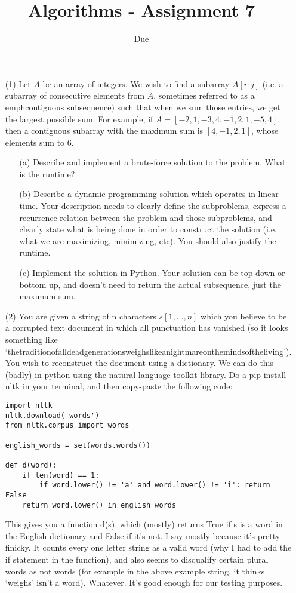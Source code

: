 \documentclass[12pt]{article}
\title{Algorithms - Assignment 7}
\date{Due }
\begin{document}
\maketitle

\begin{enumerate}
    \item[(1)] Let $A$ be an array of integers. We wish to find a subarray $A[i:j]$ (i.e. a subarray of consecutive elements from $A$, sometimes referred to as a 
    emph{contiguous subsequence}) such that when we sum those entries, we get the largest possible sum. For example, if $A=[-2, 1, -3, 4, -1, 2, 1, -5, 4]$, then a contiguous subarray with the maximum sum is $[4,-1,2,1]$, whose elements sum to $6$.
    \begin{itemize}
        \item[(a)] Describe and implement a brute-force solution to the problem. What is the runtime? 
        \item[(b)] Describe a dynamic programming solution which operates in linear time. Your description needs to clearly define the subproblems, express a recurrence relation between the problem and those subproblems, and clearly state what is being done in order to construct the solution (i.e. what we are maximizing, minimizing, etc). You should also justify the runtime. 
        \item[(c)] Implement the solution in Python. Your solution can be top down or bottom up, and doesn't need to return the actual subsequence, just the maximum sum. 
    \end{itemize}
    \item[(2)] You are given a string of n characters $s[1,\ldots,n]$ which you believe to be a corrupted text document in which all punctuation has vanished (so it looks something like `thetraditionofalldeadgenerationsweighslikeanightmareonthemindsoftheliving'). You wish to reconstruct the document using a dictionary. We can do this (badly) in python using the natural language toolkit library. Do a pip install nltk in your terminal, and then copy-paste the following code: 
    \begin{verbatim}
import nltk
nltk.download('words')
from nltk.corpus import words

english_words = set(words.words())

def d(word):
    if len(word) == 1:
	    if word.lower() != 'a' and word.lower() != 'i': return False
    return word.lower() in english_words
    \end{verbatim}
    This gives you a function d(s), which (mostly) returns True if s is a word in the English dictionary and False if it's not. I say mostly because it's pretty finicky. It counts every one letter string as a valid word (why I had to add the if statement in the function), and also seems to disqualify certain plural words as not words (for example in the above example string, it thinks `weighs' isn't a word). Whatever. It's good enough for our testing purposes. 

\end{enumerate}
\end{document}
